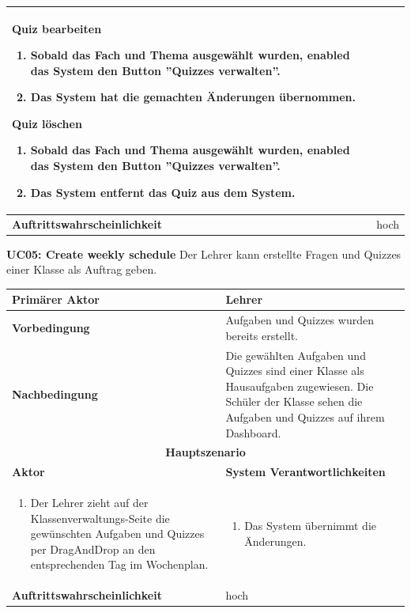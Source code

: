 \begin{tabularx}{\textwidth}{| X | X |}
		\textbf{Quiz bearbeiten}
		\begin{enumerate}
			\item Sobald das Fach und Thema ausgewählt wurden, enabled das System den Button ''Quizzes verwalten''.
			\item Das System hat die gemachten Änderungen übernommen.
		\end{enumerate}		
		
		\textbf{Quiz löschen}
		\begin{enumerate}
			\item Sobald das Fach und Thema ausgewählt wurden, enabled das System den Button ''Quizzes verwalten''.
			\item Das System entfernt das Quiz aus dem System.
		\end{enumerate}	
		\\
	\hline
		\textbf{Auftrittswahrscheinlichkeit} & hoch \\
	\hline
\end{tabularx}


\textbf{UC05: Create weekly schedule} Der Lehrer kann erstellte Fragen und Quizzes einer Klasse als Auftrag geben. 

\begin{tabularx}{\textwidth}{| X | X |}
	\hline
		\textbf{Primärer Aktor} & Lehrer \\
	\hline
		\textbf{Vorbedingung} & Aufgaben und Quizzes wurden bereits erstellt. \\
	\hline
		\textbf{Nachbedingung} & Die gewählten Aufgaben und Quizzes sind einer Klasse als Hausaufgaben zugewiesen. Die Schüler der Klasse sehen die Aufgaben und Quizzes auf ihrem Dashboard. \\
	\hline
		\multicolumn{2}{|c|}{\textbf{Hauptszenario}} \\
	\hline
		\textbf{Aktor} & \textbf{System Verantwortlichkeiten} \\
	\hline
		\begin{enumerate}
			\item Der Lehrer zieht auf der Klassenverwaltungs-Seite die gewünschten Aufgaben und Quizzes per DragAndDrop an den entsprechenden Tag im Wochenplan. 
		\end{enumerate}
			& 
		\begin{enumerate}
			\item Das System übernimmt die Änderungen.
		\end{enumerate} 
		\\
	\hline
		\textbf{Auftrittswahrscheinlichkeit} & hoch \\
	\hline
\end{tabularx}



